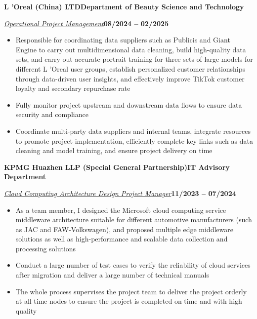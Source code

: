 \documentclass[10pt,a4paper]{article}
\newcommand{\jobcompany}[2]{\par\vspace{1.92bp}\noindent\textbf{#1}\hfill\textbf{#2}\par\vspace{1.44bp}}
\newcommand{\roleline}[2]{\par\noindent\uline{\textit{#1}}\hfill\textbf{#2}\par}
\newenvironment{cvitems}{%
  \begin{itemize}[leftmargin=14.20bp,labelwidth=4.20bp,labelsep=10.00bp,align=left,
    topsep=0bp,itemsep=0bp,parsep=0bp,partopsep=0bp,label={\textbullet}]
}{\end{itemize}}
\begin{document}
\jobcompany{L 'Oreal (China) LTD}{Department of Beauty Science and Technology}
\roleline{Operational Project Management}{08/2024 -- 02/2025}
\begin{cvitems}
\item Responsible for coordinating data suppliers such as Publicis and Giant Engine to carry out multidimensional data cleaning, build high-quality data sets, and carry out accurate portrait training for three sets of large models for different L 'Oreal user groups, establish personalized customer relationships through data-driven user insights, and effectively improve TikTok customer loyalty and secondary repurchase rate
\item Fully monitor project upstream and downstream data flows to ensure data security and compliance
\item Coordinate multi-party data suppliers and internal teams, integrate resources to promote project implementation, efficiently complete key links such as data cleaning and model training, and ensure project delivery on time
\end{cvitems}

\jobcompany{KPMG Huazhen LLP (Special General Partnership)}{IT Advisory Department}
\roleline{Cloud Computing Architecture Design Project Manager}{11/2023 -- 07/2024}
\begin{cvitems}
\item As a team member, I designed the Microsoft cloud computing service middleware architecture suitable for different automotive manufacturers (such as JAC and FAW-Volkswagen), and proposed multiple edge middleware solutions as well as high-performance and scalable data collection and processing solutions
\item Conduct a large number of test cases to verify the reliability of cloud services after migration and deliver a large number of technical manuals
\item The whole process supervises the project team to deliver the project orderly at all time nodes to ensure the project is completed on time and with high quality
\end{cvitems}
\end{document}
